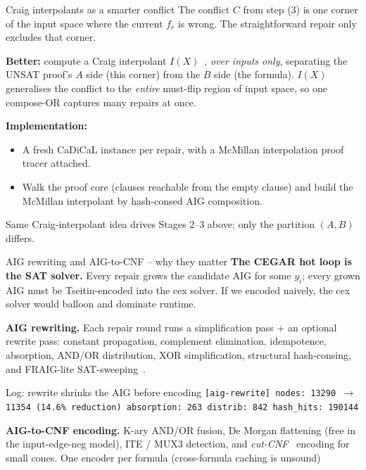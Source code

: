 \documentclass[aspectratio=169]{beamer}
\begin{document}
\begin{frame}{Craig interpolants as a smarter conflict}
  The conflict $C$ from step (3) is one \alert{corner} of the input space
  where the current $f_r$ is wrong. The straightforward repair only
  excludes that corner.
  \medskip

  \textbf{Better:} compute a \alert{Craig interpolant}
  $I(X)$~\cite{craig1957, mcmillan2003interpolation}, \emph{over inputs
  only}, separating the UNSAT proof's $A$ side (this corner) from the $B$
  side (the formula). $I(X)$ generalises the conflict to the
  \emph{entire} must-flip region of input space, so one
  compose-OR captures many repairs at once.
  \medskip

  \textbf{Implementation:}
  \begin{itemize}\setlength{\itemsep}{1pt}
    \item A fresh CaDiCaL instance per repair, with a McMillan
          interpolation proof tracer attached.
    \item Walk the proof core (clauses reachable from the empty clause)
          and build the McMillan interpolant by hash-consed AIG
          composition.
  \end{itemize}
  \medskip
  \scriptsize Same Craig-interpolant idea drives Stages 2--3 above; only
  the partition $(A,B)$ differs.
\end{frame}

\begin{frame}{AIG rewriting and AIG-to-CNF -- why they matter}
  \textbf{The CEGAR hot loop is the SAT solver.} Every repair grows the
  candidate AIG for some $y_i$; every grown AIG must be Tseitin-encoded
  into the cex solver. If we encoded naively, the cex solver
  would balloon and dominate runtime.
  \medskip

  \textbf{AIG rewriting.}
  Each repair round runs a simplification pass + an optional rewrite
  pass: constant propagation, complement elimination, idempotence,
  absorption, AND/OR distribution, XOR simplification, structural
  hash-consing, and \alert{FRAIG-lite SAT-sweeping}~\cite{mishchenko2005fraiging}.
  \medskip

  \begin{exampleblock}{\small Log: rewrite shrinks the AIG before encoding}
  \scriptsize
  \texttt{[aig-rewrite] nodes: 13290 $\rightarrow$ 11354
   (14.6\% reduction) absorption: 263 distrib: 842 hash\_hits: 190144}
  \end{exampleblock}
  \medskip

  \textbf{AIG-to-CNF encoding.}  K-ary AND/OR
  fusion, De Morgan flattening (free in the input-edge-neg model),
  ITE / MUX3 detection, and \emph{cut-CNF}~\cite{een2007applying} encoding for
  small cones.  One encoder per formula (cross-formula caching is
  unsound)
\end{frame}
\end{document}
